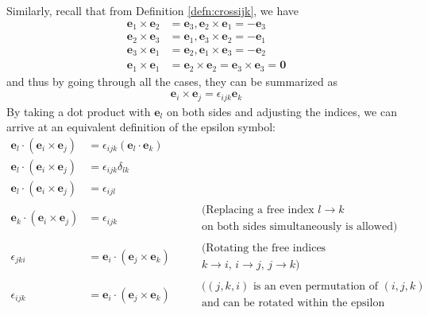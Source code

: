 Similarly, recall that from Definition \ref{defn:crossijk}, we have
\begin{subequations}
\begin{align}
\textbf{e}_1 \times \textbf{e}_2 &= \textbf{e}_3, \textbf{e}_2 \times \textbf{e}_1 = -\textbf{e}_3 \\
\textbf{e}_2 \times \textbf{e}_3 &= \textbf{e}_1, \textbf{e}_3 \times \textbf{e}_2 = -\textbf{e}_1 \\
\textbf{e}_3 \times \textbf{e}_1 &= \textbf{e}_2, \textbf{e}_1 \times \textbf{e}_3 = -\textbf{e}_2 \\
\textbf{e}_1 \times \textbf{e}_1 &= \textbf{e}_2 \times \textbf{e}_2 = \textbf{e}_3 \times \textbf{e}_3 = \textbf{0}
\end{align}   
\end{subequations}
and thus by going through all the cases, they can be summarized as
\begin{align}
\textbf{e}_i \times \textbf{e}_j= \epsilon_{ijk} \textbf{e}_k \label{eqn:epsilonee}
\end{align}
By taking a dot product with $\textbf{e}_l$ on both sides and adjusting the indices, we can arrive at an equivalent definition of the epsilon symbol:
\begin{align}
\textbf{e}_l \cdot (\textbf{e}_i \times \textbf{e}_j) &= \epsilon_{ijk} (\textbf{e}_l \cdot \textbf{e}_k)  \nonumber \\
\textbf{e}_l \cdot (\textbf{e}_i \times \textbf{e}_j) &= \epsilon_{ijk} \delta_{lk} \nonumber \\
\textbf{e}_l \cdot (\textbf{e}_i \times \textbf{e}_j) &= \epsilon_{ijl} \nonumber \\
\textbf{e}_k \cdot (\textbf{e}_i \times \textbf{e}_j) &= \epsilon_{ijk} \nonumber & &\begin{aligned}
&\text{(Replacing a free index $l \to k$} \\
&\text{on both sides simultaneously is allowed)}     
\end{aligned} \\
\epsilon_{jki} &= \textbf{e}_i \cdot (\textbf{e}_j \times \textbf{e}_k) & & \begin{aligned}
&\text{(Rotating the free indices} \\
&\text{$k \to i$, $i \to j$, $j \to k$)}    
\end{aligned}  \nonumber \\
\epsilon_{ijk} &= \textbf{e}_i \cdot (\textbf{e}_j \times \textbf{e}_k) 
& &\begin{aligned}
&\text{($(j,k,i)$ is an even permutation of $(i,j,k)$} \\
&\text{and can be rotated within the epsilon symbol)}    
\end{aligned} 
\end{align}

